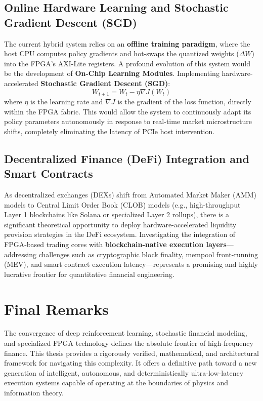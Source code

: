 \subsection{Online Hardware Learning and Stochastic Gradient Descent (SGD)}
The current hybrid system relies on an \textbf{offline training paradigm}, where the host CPU computes policy gradients and hot-swaps the quantized weights ($\Delta W$) into the FPGA's AXI-Lite registers. A profound evolution of this system would be the development of \textbf{On-Chip Learning Modules}. Implementing hardware-accelerated \textbf{Stochastic Gradient Descent (SGD)}:
\begin{equation}
    W_{t+1} = W_t - \eta \nabla J(W_t)
\end{equation}
where $\eta$ is the learning rate and $\nabla J$ is the gradient of the loss function, directly within the FPGA fabric. This would allow the system to continuously adapt its policy parameters autonomously in response to real-time market microstructure shifts, completely eliminating the latency of PCIe host intervention.

\subsection{Decentralized Finance (DeFi) Integration and Smart Contracts}
As decentralized exchanges (DEXs) shift from Automated Market Maker (AMM) models to Central Limit Order Book (CLOB) models (e.g., high-throughput Layer 1 blockchains like Solana or specialized Layer 2 rollups), there is a significant theoretical opportunity to deploy hardware-accelerated liquidity provision strategies in the DeFi ecosystem. Investigating the integration of FPGA-based trading cores with \textbf{blockchain-native execution layers}—addressing challenges such as cryptographic block finality, mempool front-running (MEV), and smart contract execution latency—represents a promising and highly lucrative frontier for quantitative financial engineering.

\section{Final Remarks}
The convergence of deep reinforcement learning, stochastic financial modeling, and specialized FPGA technology defines the absolute frontier of high-frequency finance. This thesis provides a rigorously verified, mathematical, and architectural framework for navigating this complexity. It offers a definitive path toward a new generation of intelligent, autonomous, and deterministically ultra-low-latency execution systems capable of operating at the boundaries of physics and information theory.
